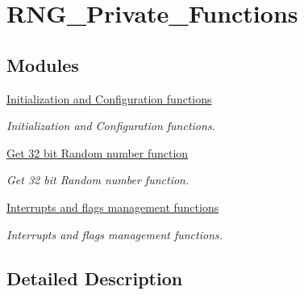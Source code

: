 \hypertarget{group___r_n_g___private___functions}{\section{R\-N\-G\-\_\-\-Private\-\_\-\-Functions}
\label{group___r_n_g___private___functions}
}
\subsection*{Modules}
\begin{DoxyCompactItemize}
\item 
\hyperlink{group___r_n_g___group1}{Initialization and Configuration functions}
\begin{DoxyCompactList}\small\item\em Initialization and Configuration functions. \end{DoxyCompactList}\item 
\hyperlink{group___r_n_g___group2}{Get 32 bit Random number function}
\begin{DoxyCompactList}\small\item\em Get 32 bit Random number function. \end{DoxyCompactList}\item 
\hyperlink{group___r_n_g___group3}{Interrupts and flags management functions}
\begin{DoxyCompactList}\small\item\em Interrupts and flags management functions. \end{DoxyCompactList}\end{DoxyCompactItemize}


\subsection{Detailed Description}
